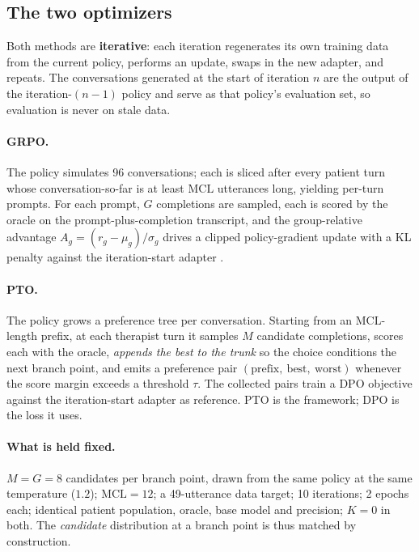 \subsection{The two optimizers}
Both methods are \textbf{iterative}: each iteration regenerates its own training data from
the current policy, performs an update, swaps in the new adapter, and repeats. The
conversations generated at the start of iteration $n$ are the output of the iteration-$(n{-}1)$
policy and serve as that policy's evaluation set, so evaluation is never on stale data.

\paragraph{GRPO.} The policy simulates 96 conversations; each is sliced after every patient
turn whose conversation-so-far is at least $\mathrm{MCL}$ utterances long, yielding per-turn
prompts. For each prompt, $G$ completions are sampled, each is scored by the oracle on the
prompt-plus-completion transcript, and the group-relative advantage
$A_g=(r_g-\mu_g)/\sigma_g$ drives a clipped policy-gradient update with a KL penalty against
the iteration-start adapter \citep{schulman2017ppo,shao2024deepseekmath}.

\paragraph{PTO.} The policy grows a preference tree per conversation. Starting from an
$\mathrm{MCL}$-length prefix, at each therapist turn it samples $M$ candidate completions,
scores each with the oracle, \emph{appends the best to the trunk} so the choice conditions
the next branch point, and emits a preference pair
$(\text{prefix},\ \text{best},\ \text{worst})$ whenever the score margin exceeds a threshold
$\tau$. The collected pairs train a DPO objective \citep{rafailov2023dpo} against the
iteration-start adapter as reference. PTO is the framework; DPO is the loss it uses.

\paragraph{What is held fixed.} $M=G=8$ candidates per branch point, drawn from the same policy
at the same temperature ($1.2$); $\mathrm{MCL}=12$; a 49-utterance data target; 10 iterations;
2 epochs each; identical patient population, oracle, base model and precision; $K=0$ in both.
The \emph{candidate} distribution at a branch point is thus matched by construction.

